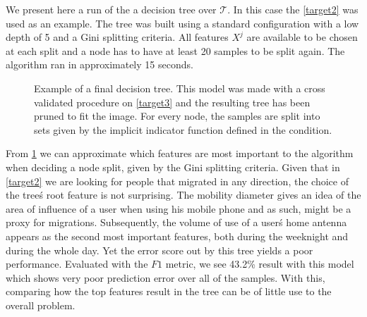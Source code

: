 We present here a run of the a decision tree over $\mathcal{T}$.
In this case the \cref{target2} was used as an example.
The tree was built using a standard configuration with a low depth of 5 and a Gini splitting criteria.
All features $X^j$ are available to be chosen at each split and a node has to have at least 20 samples to be split again. 
The algorithm ran in approximately 15 seconds.

\bigskip

\begin{figure}
	\centering
	\caption{ Example of a final decision tree. 
		This model was made with a cross validated procedure on \cref{target3} and the resulting tree has been pruned to fit the image. 
		For every node, the samples are split into sets given by the implicit indicator function defined in the condition.}
	\label{fig:decision_tree_actual_problem}
\end{figure}




\smallskip


From \cref{fig:decision_tree_actual_problem} we can approximate which features are most important to the algorithm when deciding a node split, given by the Gini splitting criteria.
Given that in \cref{target2} we are looking for people that migrated in any direction, the choice of the tree\'s root feature is not surprising.
The mobility diameter gives an idea of the area of influence of a user when using his mobile phone and as such, might be a proxy for migrations.
Subsequently, the volume of use of a user\'s home antenna appears as the second most important features, both during the weeknight and during the whole day.
Yet the error score out by this tree yields a poor performance. 
Evaluated with the $F1$ metric, we see 43.2\% result with this model which shows very poor prediction error over all of the samples.
With this, comparing how the top features result in the tree can be of little use to the overall problem.

